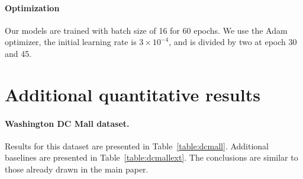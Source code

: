 \paragraph{Optimization}
Our models are trained with batch size of 16 for 60 epochs.
We use the Adam optimizer,
the initial learning rate is $3 \times 10^{-4}$, and is divided by two at epoch 30 and 45.

\section{Additional quantitative results}

\paragraph{Washington DC Mall dataset.} Results for this dataset are presented in Table~\ref{table:dcmall}. Additional baselines are presented in Table~\ref{table:dcmallext}.
The conclusions are similar to those already drawn in the main paper.


